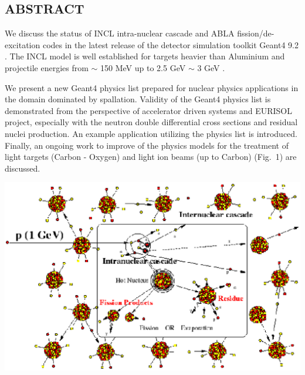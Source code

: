 \documentclass[20pt]{article}
\newenvironment{textbox}
{\begin{lrbox}{\dummybox}\begin{minipage}{0.9\columnwidth}}
{\end{minipage}\end{lrbox}\raisebox{-\depth}{\psshadowbox[framesep=1em,framearc=.1,shadow=true]{\usebox{\dummybox}}}\vspace{0.005\textheight}}
\begin{document}
\begin{center}
\begin{multicols}{3}
\begin{textbox}

\section*{{\Huge {\sf ABSTRACT}}}

We discuss the status of INCL intra-nuclear cascade and ABLA fission/de-excitation codes
in the latest release of the detector simulation toolkit Geant4 9.2 \cite{pk09aCollaboration, pk08aProceedings}.
The INCL model is well established for targets heavier than Aluminium
and projectile energies from $\sim$ 150 MeV up to 2.5 GeV $\sim$ 3 GeV \cite{pk08bProceedings}. 

We present a new Geant4 physics list prepared for nuclear physics applications
in the domain dominated by spallation.
Validity of the Geant4 physics list is demonstrated from the perspective of accelerator driven systems
and EURISOL project, especially with the neutron double differential cross sections and residual
nuclei production.
An example application utilizing the physics list is introduced.
Finally, an ongoing work to improve of the physics models for the treatment of 
light targets (Carbon - Oxygen) and light ion beams (up to Carbon) (Fig.~1) are discussed.

\end{textbox}

\hspace{-1cm} \includegraphics[scale=0.73]{images/cascade.eps}


\end{multicols}
\end{center}
\end{document}
